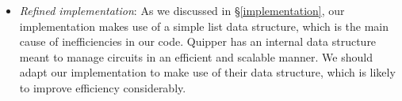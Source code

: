 \begin{itemize}
  \item \textit{Refined implementation}: As we discussed in \S\ref{implementation}, our implementation makes use of a simple list data structure, which is the main cause of inefficiencies in our code. Quipper has an internal data structure meant to manage circuits in an efficient and scalable manner. We should adapt our implementation to make use of their data structure, which is likely to improve efficiency considerably.

\end{itemize}
